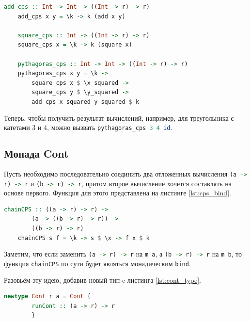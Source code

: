 \documentclass[times]{itmo-student-thesis}
\begin{document}
\begin{lstlisting}[language=Haskell,float=!h,caption={Теорема Пифагора в CPS},label={lst:pythagoras_cps}]
    add_cps :: Int -> Int -> ((Int -> r) -> r)
    add_cps x y = \k -> k (add x y)
    
    square_cps :: Int -> ((Int -> r) -> r)
    square_cps x = \k -> k (square x)
    
    pythagoras_cps :: Int -> Int -> ((Int -> r) -> r)
    pythagoras_cps x y = \k ->
        square_cps x $ \x_squared ->
        square_cps y $ \y_squared ->
        add_cps x_squared y_squared $ k
\end{lstlisting}

Теперь, чтобы получить результат вычислений, например, для треугольника с катетами 3 и 4, можно вызвать \lstinline[language=Haskell]{pythagoras_cps 3 4 id}.

\subsection{Монада Cont}\label{sec:cps_monad}

Пусть необходимо последовательно соединить два
отложенных вычисления \lstinline[language=Haskell]{(a -> r) -> r} и \lstinline[language=Haskell]{(b -> r) -> r}, 
притом второе вычисление хочется составлять на основе первого. Функция для этого представлена на листинге \ref{lst:cps_bind}.

\begin{lstlisting}[language=Haskell,float=!h,caption={Соединение отложенных вычислений},label={lst:cps_bind}]
    chainCPS :: ((a -> r) -> r) -> 
        (a -> ((b -> r) -> r)) -> 
        ((b -> r) -> r)
    chainCPS s f = \k -> s $ \x -> f x $ k
\end{lstlisting}

Заметим, что если заменить \lstinline[language=Haskell]{(a -> r) -> r} на \lstinline[language=Haskell]{m a}, а 
\lstinline[language=Haskell]{(b -> r) -> r} на \lstinline[language=Haskell]{m b}, то функция \lstinline[language=Haskell]{chainCPS}
по сути будет являться монадическим \lstinline[language=Haskell]{bind}.

Разовьём эту идею, добавив новый тип c листинга \ref{lst:cont_type}.

\begin{lstlisting}[language=Haskell,float=!h,caption={Тип Cont},label={lst:cont_type}]
    newtype Cont r a = Cont { 
        runCont :: (a -> r) -> r 
        }
\end{lstlisting}
\end{document}
